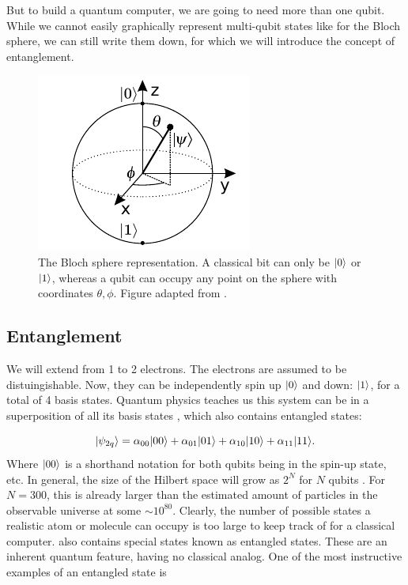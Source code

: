 But to build a quantum computer, we are going to need more than one qubit. 
While we cannot easily graphically represent multi-qubit states like for the Bloch sphere, we can still write them down, for which we will introduce the concept of entanglement.

\begin{figure}
	\centering
	\includegraphics[width=.28\linewidth]{figures/BlochSphereCropped.pdf}
	\caption{The Bloch sphere representation. A classical bit can only be $\lvert0\rangle$ or $\lvert1\rangle$, whereas a qubit can occupy any point on the sphere with coordinates $\theta, \phi$. Figure adapted from \cite{Jones2012}.}
	\label{fig:BlochSphere}
\end{figure}

\subsection{Entanglement}\label{sub:Entanglement}

We will extend from 1 to 2 electrons. 
The electrons are assumed to be distuingishable. 
Now, they can be independently spin up $\lvert0\rangle$ and down: $\lvert1\rangle$, for a total of 4 basis states.
Quantum physics teaches us this system can be in a superposition of all its basis states \cite{Nielsen2011}, which also contains entangled states:

\begin{equation}\label{eq:TwoQubits}
	\lvert\psi_{2q}\rangle = 
	\alpha_{00} \lvert00\rangle + \alpha_{01} \lvert01\rangle + \alpha_{10} \lvert10\rangle + \alpha_{11} \lvert11\rangle.
\end{equation}
Where $\lvert00\rangle$ is a shorthand notation for both qubits being in the spin-up state, etc.
In general, the size of the Hilbert space will grow as $2^N$ for $N$ qubits \cite{Nielsen2011,Henriet2020}. 
For $N=300$, this is already larger than the estimated amount of particles in the observable universe at some $\sim 10^{80}$. 
Clearly, the number of possible states a realistic atom or molecule can occupy is too large to keep track of for a classical computer.
 also contains special states known as entangled states. 
These are an inherent quantum feature, having no classical analog.
One of the most instructive examples of an entangled state is 

